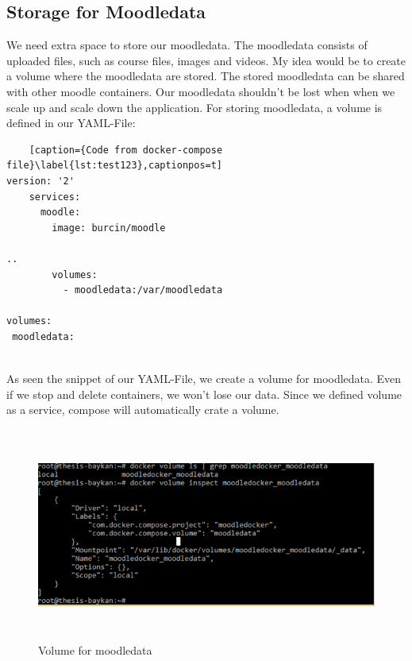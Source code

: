 \subsection{Storage for Moodledata}
We need extra space to store our moodledata. The moodledata consists of uploaded files, such as course files, images and videos. My idea would be to create a volume where the moodledata are stored. The stored moodledata can be shared with other moodle containers. Our moodledata shouldn’t be lost when when we scale up and scale down the application. For storing moodledata, a volume is defined in our YAML-File:


 \begin{lstlisting}
    [caption={Code from docker-compose file}\label{lst:test123},captionpos=t] 
version: '2'
	services:
	  moodle:
	    image: burcin/moodle

..
	    volumes: 
	      - moodledata:/var/moodledata
  
volumes:
 moodledata:


 \end{lstlisting}
 
 
As seen the snippet of our YAML-File, we create a volume for moodledata. Even if we stop and delete containers, we won’t lose our data. Since we defined volume as a service, compose will automatically crate a volume. 

\begin{figure}[ht]
	\centering
  \includegraphics[width=14cm, height=7cm]{v_moodledata.png}
	\caption{Volume for moodledata}
	\label{fig2}
\end{figure}


